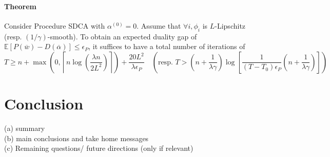 \documentclass{article}
\begin{document}
\paragraph{Theorem} Consider Procedure SDCA with $\alpha^{(0)} = 0$.
Assume that $\forall i, \phi_i$ is $L$-Lipschitz (resp.
$(1/\gamma)$-smooth).
To obtain an expected duality gap of $\mathbb{E}[P(\overline{w})-D(\overline{\alpha})] \leq \epsilon_P$, it suffices to have a total number of iterations of
\begin{equation}
	T \geq n + \max\left(0, \left\lceil n \log \left(\dfrac{\lambda n}{2 L^2} \right) \right\rceil \right) + \dfrac{20 L^2}{\lambda \epsilon_P} \quad \left( \text{resp. } T > \left(n + \dfrac{1}{\lambda \gamma} \right) \log \left[ \dfrac{1}{(T-T_0)\epsilon_P} \left(n + \dfrac{1}{\lambda \gamma} \right) \right] \right)
\end{equation}


\newpage
\section{Conclusion}
(a) summary \\
(b) main conclusions and take home messages \\
(c) Remaining questions/ future directions (only if relevant) \\
\end{document}
